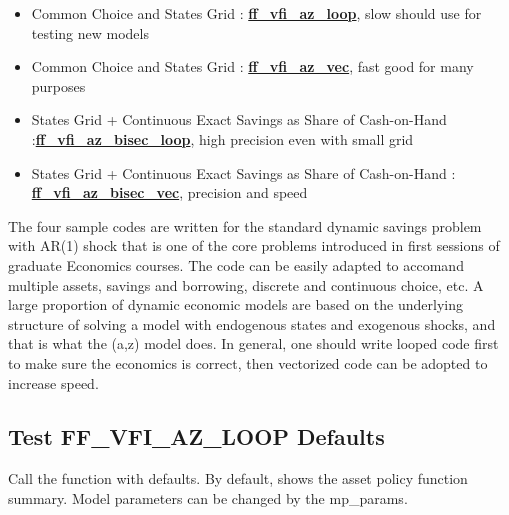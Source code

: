 \documentclass[
]{book}
\begin{document}
\begin{itemize}
\item
  Common Choice and States Grid :
  \href{https://github.com/FanWangEcon/MEconTools/blob/master/MEconTools/vfi/ff_vfi_az_loop.m}{\textbf{ff\_vfi\_az\_loop}},
  slow should use for testing new models
\item
  Common Choice and States Grid :
  \href{https://github.com/FanWangEcon/MEconTools/blob/master/MEconTools/vfi/ff_vfi_az_vec.m}{\textbf{ff\_vfi\_az\_vec}},
  fast good for many purposes
\item
  States Grid + Continuous Exact Savings as Share of Cash-on-Hand :\href{https://github.com/FanWangEcon/MEconTools/blob/master/MEconTools/vfi/ff_vfi_az_bisec_loop.m}{\textbf{ff\_vfi\_az\_bisec\_loop}},
  high precision even with small grid
\item
  States Grid + Continuous Exact Savings as Share of Cash-on-Hand :
  \href{https://github.com/FanWangEcon/MEconTools/blob/master/MEconTools/vfi/ff_vfi_az_bisec_vec.m}{\textbf{ff\_vfi\_az\_bisec\_vec}},
  precision and speed
\end{itemize}

The four sample codes are written for the standard dynamic savings
problem with AR(1) shock that is one of the core problems introduced in
first sessions of graduate Economics courses. The code can be easily
adapted to accomand multiple assets, savings and borrowing, discrete and
continuous choice, etc. A large proportion of dynamic economic models
are based on the underlying structure of solving a model with endogenous
states and exogenous shocks, and that is what the (a,z) model does. In
general, one should write looped code first to make sure the economics
is correct, then vectorized code can be adopted to increase speed.

\hypertarget{test-ff_vfi_az_loop-defaults}{%
\subsection{Test FF\_VFI\_AZ\_LOOP Defaults}\label{test-ff_vfi_az_loop-defaults}}

Call the function with defaults. By default, shows the asset policy
function summary. Model parameters can be changed by the mp\_params.
\end{document}
